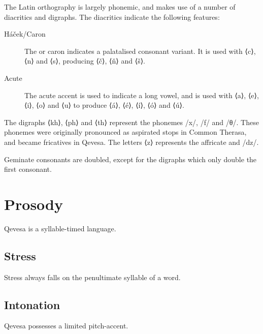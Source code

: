 \documentclass[grammar]{subfiles}
\begin{document}
  The Latin orthography is largely phonemic, and makes use of a number of
  diacritics and digraphs.  The diacritics indicate the following features:

  \begin{description}
    \item[Háček/Caron] The  or caron indicates a palatalised
      consonant variant.  It is used with ⟨c⟩, ⟨n⟩ and ⟨s⟩, producing ⟨č⟩, ⟨ň⟩
      and ⟨š⟩.  
    \item[Acute] The acute accent is used to indicate a long vowel, and is used
      with ⟨a⟩, ⟨e⟩, ⟨i⟩, ⟨o⟩ and ⟨u⟩ to produce ⟨á⟩, ⟨é⟩, ⟨í⟩, ⟨ó⟩ and ⟨ú⟩.  
  \end{description}

  The digraphs ⟨kh⟩, ⟨ph⟩ and ⟨th⟩ represent the phonemes /x/, /f/ and /θ/.
  These phonemes were originally pronounced as aspirated stops in Common
  Therasa, and became fricatives in Qevesa. The letters ⟨z⟩ represents
  the affricate and /dz/.

  Geminate consonants are doubled, except for the digraphs which only double the first consonant.  



  \section{Prosody}
  \label{sec:prosody}

  Qevesa is a syllable-timed language.
  \ToBeWritten

  \subsection{Stress}
  \label{ssec:stress}

  Stress always falls on the penultimate syllable of a word. 
  \ToBeWritten

  \subsection{Intonation}
  \label{ssec:intonation}

  Qevesa possesses a limited pitch-accent.
  \ToBeWritten
\end{document}
